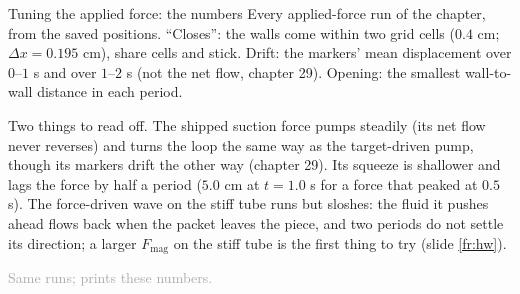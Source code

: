 \documentclass[aspectratio=169,11pt]{beamer}
\newcommand{\sourcecredit}[1]{\vfill\begin{flushright}\tiny\textcolor{DarkGray}{#1}\end{flushright}}
\begin{document}
\begin{frame}{Tuning the applied force: the numbers}
\label{fr:fmag2}
\scriptsize Every applied-force run of the chapter, from the saved positions. ``Closes'': the walls come within two grid cells ($0.4$ cm; $\Delta x = 0.195$ cm), share cells and stick. Drift: the markers' mean displacement over $0$--$1$ s and over $1$--$2$ s (not the net flow, chapter 29). Opening: the smallest wall-to-wall distance in each period.
\par{}\vspace{1pt}
\scriptsize Two things to read off. The shipped suction force pumps steadily (its net flow never reverses) and turns the loop the same way as the target-driven pump, though its markers drift the other way (chapter 29). Its squeeze is shallower and lags the force by half a period ($5.0$ cm at $t = 1.0$ s for a force that peaked at $0.5$ s). The force-driven wave on the stiff tube runs but sloshes: the fluid it pushes ahead flows back when the packet leaves the piece, and two periods do not settle its direction; a larger $F_{\mathrm{mag}}$ on the stiff tube is the first thing to try (slide \ref{fr:hw}).
\sourcecredit{Same runs;  prints these numbers.}
\end{frame}
\end{document}

